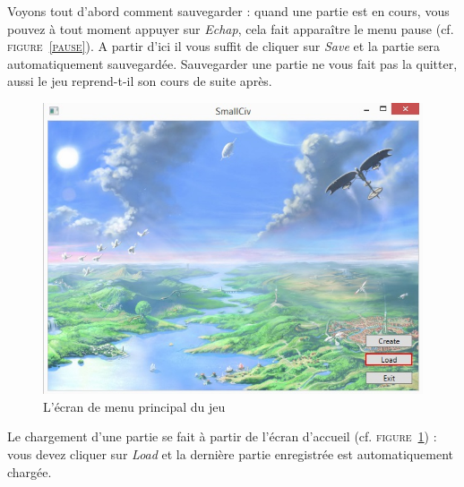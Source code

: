 Voyons tout d'abord comment sauvegarder : quand une partie est en cours, vous pouvez à tout moment appuyer sur \emph{Echap}, cela fait apparaître le menu pause (cf. \textsc{figure~\ref{pause}}). A partir d'ici il vous suffit de cliquer sur \emph{Save} et la partie sera automatiquement sauvegardée. Sauvegarder une partie ne vous fait pas la quitter, aussi le jeu reprend-t-il son cours de suite après. \newline

\begin{figure}[h]
	\centering
	\includegraphics{img/acceuil_to_load.jpg}
	\caption{L'écran de menu principal du jeu}
	\label{start2}
\end{figure}
Le chargement d'une partie se fait à partir de l'écran d’accueil (cf. \textsc{figure~\ref{start2}}) : vous devez cliquer sur \emph{Load} et la dernière partie enregistrée est automatiquement chargée. 

